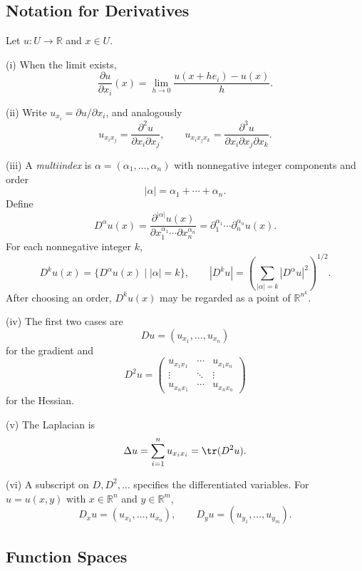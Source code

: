 \subsection{Notation for Derivatives}
\label{sec:notation-for-derivatives}

\begin{definition}
\label{def:derivative-notation-multiindex}
Let $u:U\to\mathbb R$ and $x\in U$.

(i) When the limit exists,
\[
\frac{\partial u}{\partial x_i}(x)
=\lim_{h\to0}\frac{u(x+he_i)-u(x)}{h}.
\]

(ii) Write $u_{x_i}=\partial u/\partial x_i$, and analogously
\[
u_{x_ix_j}=\frac{\partial^2u}{\partial x_i\partial x_j},
\qquad
u_{x_ix_jx_k}=\frac{\partial^3u}{\partial x_i\partial x_j\partial x_k}.
\]

(iii) A \textit{multiindex} is $\alpha=(\alpha_1,\ldots,\alpha_n)$ with nonnegative integer components and order
\[
|\alpha|=\alpha_1+\cdots+\alpha_n.
\]
Define
\[
D^\alpha u(x)
=\frac{\partial^{|\alpha|}u(x)}
{\partial x_1^{\alpha_1}\cdots\partial x_n^{\alpha_n}}
=\partial_1^{\alpha_1}\cdots\partial_n^{\alpha_n}u(x).
\]
For each nonnegative integer $k$,
\[
D^ku(x)=\{D^\alpha u(x)\mid |\alpha|=k\},
\qquad
|D^ku|=\left(\sum_{|\alpha|=k}|D^\alpha u|^2\right)^{1/2}.
\]
After choosing an order, $D^ku(x)$ may be regarded as a point of $\mathbb R^{n^k}$.

(iv) The first two cases are
\[
Du=(u_{x_1},\ldots,u_{x_n})
\]
for the gradient and
\[
D^2u=
\begin{pmatrix}
u_{x_1x_1}&\cdots&u_{x_1x_n}\\
\vdots&\ddots&\vdots\\
u_{x_nx_1}&\cdots&u_{x_nx_n}
\end{pmatrix}
\]
for the Hessian.

(v) The Laplacian is
\[
\Delta u=\sum_{i=1}^nu_{x_ix_i}=\tr(D^2u).
\]

(vi) A subscript on $D,D^2,\ldots$ specifies the differentiated variables. For $u=u(x,y)$ with $x\in\mathbb R^n$ and $y\in\mathbb R^m$,
\[
D_xu=(u_{x_1},\ldots,u_{x_n}),
\qquad
D_yu=(u_{y_1},\ldots,u_{y_m}).
\]
\end{definition}

\subsection{Function Spaces}
\label{sec:function-spaces-notation}

